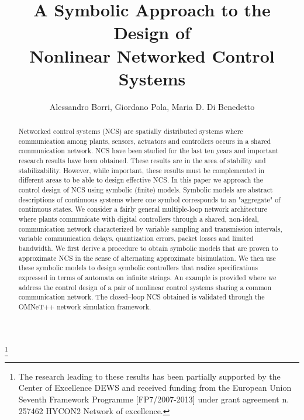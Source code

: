 \documentclass{amsart}
\begin{document}
\title[A Symbolic Approach to the Design of \\ Nonlinear Networked Control Systems]{A Symbolic Approach to the Design of \\ Nonlinear Networked Control Systems}
\thanks{The research leading to these results has been partially supported by the Center of Excellence DEWS and received funding from the European Union Seventh Framework Programme [FP7/2007-2013] under grant agreement n. 257462 HYCON2 Network of excellence.}

\author[Alessandro Borri, Giordano Pola, Maria D. Di Benedetto]{
Alessandro Borri, Giordano Pola, Maria D. Di Benedetto}
\address{
Department of Electrical and Information Engineering, Center of Excellence DEWS,
University of L{'}Aquila, 67100 L{'}Aquila, Italy}

\begin{abstract}
Networked control systems (NCS) are spatially distributed systems where communication among plants, sensors, actuators and controllers occurs in a shared communication network. NCS have been studied for the last ten years and important research results have been obtained. These results are in the area of stability and stabilizability. However, while important, these results must be complemented in different areas to be able to design effective NCS. In this paper we approach the control design of NCS using symbolic (finite) models. Symbolic models are abstract descriptions of continuous systems where one symbol corresponds to an "aggregate" of continuous states. 
We consider a fairly general multiple-loop network architecture where plants communicate with digital controllers through a shared, non-ideal, communication network characterized by variable sampling and transmission intervals, variable communication delays, quantization errors, packet losses and limited bandwidth. We first derive a procedure to obtain symbolic models that are proven to approximate NCS in the sense of alternating approximate bisimulation. We then use these symbolic models to design symbolic controllers that realize specifications expressed in terms of automata on infinite strings. An example is provided where we address the control design of a pair of nonlinear control systems sharing a common communication network. The closed--loop NCS obtained is validated through the OMNeT++ network simulation framework.
\end{abstract}

\maketitle
\end{document}
